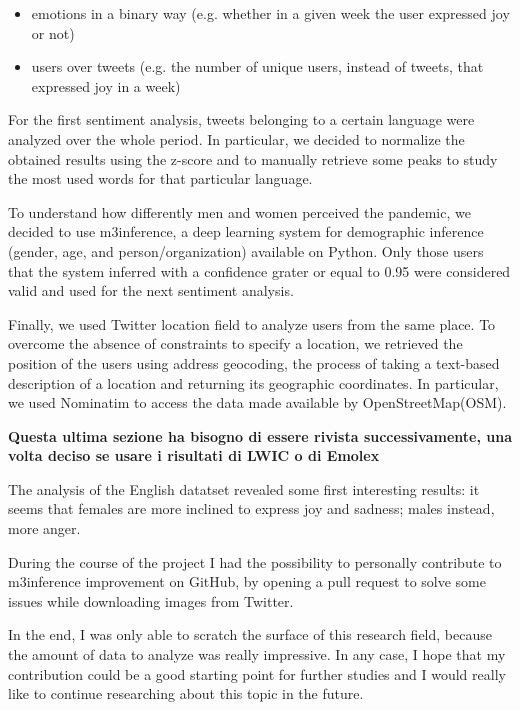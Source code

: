 \begin{itemize}
	\item emotions in a binary way (e.g. whether in a given week the user expressed joy or not)
	\item users over tweets (e.g. the number of unique users, instead of tweets, that expressed joy in a week)
\end{itemize}


For the first sentiment analysis, tweets belonging to a certain language were analyzed over the whole period. In particular, we decided to normalize the obtained results using the z-score and to manually retrieve some peaks to study the most used words for that particular language.

To understand how differently men and women perceived the pandemic, we decided to use m3inference, a deep learning system for demographic inference (gender, age, and person/organization) available on Python. Only those users that the system inferred with a confidence grater or equal to 0.95 were considered valid and used for the next sentiment analysis.

Finally, we used Twitter location field to analyze users from the same place. To overcome the absence of constraints to specify a location, we retrieved the position of the users using address geocoding, the process of taking a text-based description of a location and returning its geographic coordinates. In particular, we used Nominatim to access the data made available by OpenStreetMap(OSM).


\textbf{Questa ultima sezione ha bisogno di essere rivista successivamente, una volta deciso se usare i risultati di LWIC o di Emolex}

The analysis of the English datatset revealed some first interesting results: it seems that females are more inclined to express joy and sadness; males instead, more anger.

During the course of the project I had the possibility to personally contribute to m3inference improvement on GitHub, by opening a pull request to solve some issues while downloading images from Twitter.

In the end, I was only able to scratch the surface of this research field, because the amount of data to analyze was really impressive. In any case, I hope that my contribution could be a good starting point for further studies and I would really like to continue researching about this topic in the future.